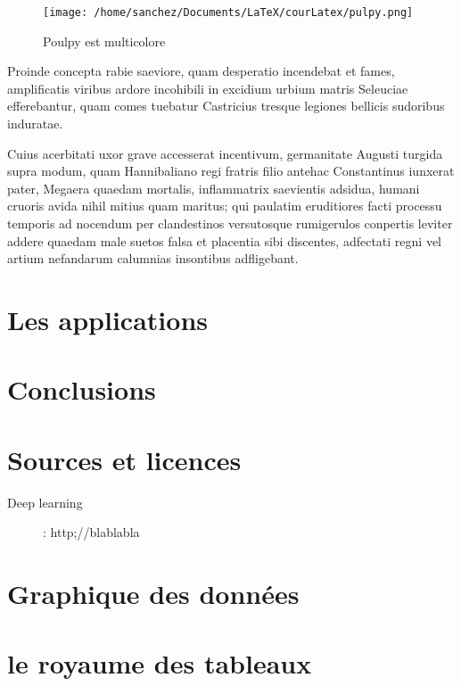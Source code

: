 \documentclass{report}
\begin{document}
\begin{figure}[hb]
\begin{center}
\texttt{[image: /home/sanchez/Documents/LaTeX/courLatex/pulpy.png]} 
\end{center}
\caption{Poulpy est multicolore}
\label{Poulpy est multicolore}
\end{figure}


Proinde concepta rabie saeviore, quam desperatio incendebat et fames, amplificatis viribus ardore incohibili in excidium urbium matris Seleuciae efferebantur, quam comes tuebatur Castricius tresque legiones bellicis sudoribus induratae.

Cuius acerbitati uxor grave accesserat incentivum, germanitate Augusti turgida supra modum, quam Hannibaliano regi fratris filio antehac Constantinus iunxerat pater, Megaera quaedam mortalis, inflammatrix saevientis adsidua, humani cruoris avida nihil mitius quam maritus; qui paulatim eruditiores facti processu temporis ad nocendum per clandestinos versutosque rumigerulos conpertis leviter addere quaedam male suetos falsa et placentia sibi discentes, adfectati regni vel artium nefandarum calumnias insontibus adfligebant.


\chapter{Les applications}

\chapter*{Conclusions}

\chapter*{Sources et licences}

\begin{description}
 \item [Deep learning]: http;//blablabla
 
\end{description}  





\appendix

\chapter{Graphique des données}

\chapter{le royaume des tableaux}
\end{document}
